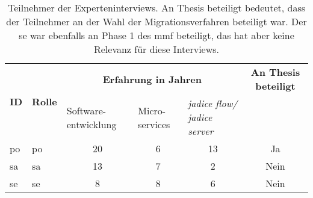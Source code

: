 \begin{table}[!ht]
  \centering
  \begin{tabular}{|l|l| p{1.8cm} p{1.5cm} p{2cm}|c|}
    \toprule
    \multirow{2}{*}[0cm]{\textbf{ID}} & \multirow{2}{*}[0cm]{\textbf{Rolle}} & \multicolumn{3}{c|}{\textbf{Erfahrung in Jahren}} & \textbf{An Thesis beteiligt} \\
     & & Software-entwicklung & Micro-services & \emph{jadice flow/ jadice server} & \\ \midrule
    \acrshort{po} & \acrlong{po} & \multicolumn{1}{c}{20} & \multicolumn{1}{c}{6} & \multicolumn{1}{c|}{13} & Ja \\
    \acrshort{sa} & \acrlong{sa}       & \multicolumn{1}{c}{13} & \multicolumn{1}{c}{7} & \multicolumn{1}{c|}{2} & Nein \\
   \acrshort{se} & \acrlong{se}     & \multicolumn{1}{c}{8} & \multicolumn{1}{c}{8} & \multicolumn{1}{c|}{6} & Nein \\
    \bottomrule
  \end{tabular}
  \caption[Teilnehmer der Experteninterviews]{
    Teilnehmer der Experteninterviews.
    An Thesis beteiligt bedeutet, dass der Teilnehmer an der Wahl der Migrationsverfahren beteiligt war.
    Der \acrshort{se} war ebenfalls an Phase 1 des \gls{mmf} beteiligt, das hat aber keine Relevanz für diese Interviews.
  }
  \label{tab:expert-interviewees}
\end{table}
